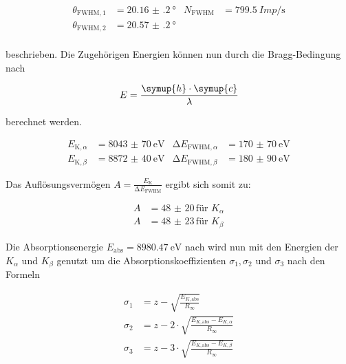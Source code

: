         \begin{align*}
            \theta_{\text{FWHM}, 1} &= \SI{20.16(20)}{\degree} & N_{\text{FWHM}} &= \SI{799.5}{Imp\per\second} \\
            \theta_{\text{FWHM}, 2} &= \SI{20.57(20)}{\degree}  \\
        \end{align*}

        \noindent beschrieben. Die Zugehörigen Energien können nun durch die Bragg-Bedingung nach 

        \begin{equation}
            E = \frac{\symup{h} \cdot \symup{c}}{\lambda} 
        \end{equation}

        \noindent berechnet werden.

        \begin{align*}
            E_{\text{K}, \alpha} &= \SI{8043(70)}{\electronvolt} & \increment E_{\text{FWHM}, \alpha } &= \SI{170(70)}{\electronvolt}\\
            E_{\text{K}, \beta} &= \SI{8872(40)}{\electronvolt}  & \increment E_{\text{FWHM}, \beta } &= \SI{180(90)}{\electronvolt}
        \end{align*}
        
        \noindent Das Auflösungsvermögen $A = \frac{E_{\text{K}}}{\increment E_{\text{FWHM}}}$ ergibt sich somit zu:

        \begin{align*}
          A&= \num{48(20)}\, \text{für } K_{\alpha}\\
          A&= \num{48(23)}\, \text{für }  K_{\beta} 
        \end{align*}

        \noindent Die Absorptionsenergie $E_{\text{abs}} = \SI{8980.47}{\electronvolt}$ nach \cite{E_abs} wird nun mit den Energien der 
        $K_{\alpha}$ und $K_{\beta}$ genutzt um die Absorptionskoeffizienten $\sigma_1, \sigma_2$ und $\sigma_3$ nach den Formeln

        \begin{align}
            \sigma_1 &= z - \sqrt{\frac{E_{K,\text{abs}}}{R_{\infty}}} \label{eq:sigma1} \\
            \sigma_2 &= z - 2 \cdot \sqrt{\frac{E_{K,\text{abs}} - E_{K, \alpha}}{R_{\infty}}} \label{eq:sigma2} \\
            \sigma_3 &= z - 3 \cdot \sqrt{\frac{E_{K,\text{abs}} - E_{K, \beta}}{R_{\infty}}} \label{eq:sigma3} 
        \end{align}
        
